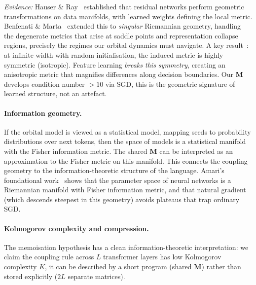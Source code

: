 \documentclass[11pt, a4paper]{article}
\newcommand{\M}{\mathbf{M}}
\theoremstyle{remark}
\begin{document}
\textit{Evidence:} Hauser \& Ray~\cite{hauser2017riemannian} established that residual networks perform geometric transformations on data manifolds, with learned weights defining the local metric.
Benfenati \& Marta~\cite{benfenati2022singular} extended this to \emph{singular} Riemannian geometry, handling the degenerate metrics that arise at saddle points and representation collapse regions, precisely the regimes our orbital dynamics must navigate.
A key result~\cite{training2023geometry}: at infinite width with random initialisation, the induced metric is highly symmetric (isotropic).
Feature learning \emph{breaks this symmetry}, creating an anisotropic metric that magnifies differences along decision boundaries.
Our $\M$ develops condition number $> 10$ via SGD, this is the geometric signature of learned structure, not an artefact.

\paragraph{Information geometry.}
If the orbital model is viewed as a statistical model, mapping seeds to probability distributions over next tokens, then the space of models is a statistical manifold with the Fisher information metric.
The shared $\M$ can be interpreted as an approximation to the Fisher metric on this manifold.
This connects the coupling geometry to the information-theoretic structure of the language.
Amari's foundational work~\cite{amari2019fisher} shows that the parameter space of neural networks is a Riemannian manifold with Fisher information metric, and that natural gradient (which descends steepest in this geometry) avoids plateaus that trap ordinary SGD.

\paragraph{Kolmogorov complexity and compression.}
The memoisation hypothesis has a clean information-theoretic interpretation: we claim the coupling rule across $L$ transformer layers has low Kolmogorov complexity $K$, it can be described by a short program (shared $\M$) rather than stored explicitly ($2L$ separate matrices).
\end{document}
